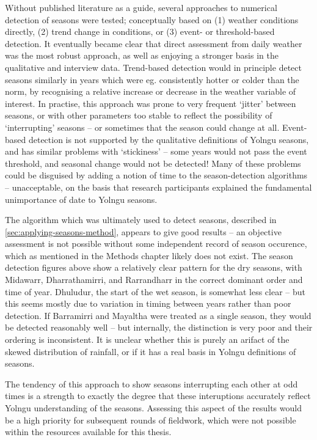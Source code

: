 Without published literature as a guide, several approaches to numerical
detection of seasons were tested; conceptually based on (1) weather conditions
directly, (2) trend change in conditions, or (3) event- or threshold-based
detection.  It eventually became clear that direct assessment from daily
weather was the most robust approach, as well as enjoying a stronger basis
in the qualitative and interview data.
%
Trend-based detection would in principle detect seasons similarly in years
which were eg. consistently hotter or colder than the norm, by recognising
a relative increase or decrease in the weather variable of interest.  In
practise, this approach was prone to very frequent `jitter' between seasons,
or with other parameters too stable to reflect the possibility of `interrupting'
seasons -- or sometimes that the season could change at all.
%
Event-based detection is not supported by the qualitative definitions of Yolngu
seasons, and has similar problems with `stickiness' -- some years would
not pass the event threshold, and seasonal change would not be detected!
%
Many of these problems could be disguised by adding a notion of time to the
season-detection algorithms -- unacceptable, on the basis that research
participants explained the fundamental unimportance of date to Yolngu seasons.


The algorithm which was ultimately used to detect seasons,
described in \cref{sec:applying-seasons-method}, appears to give good results
-- an objective assessment is not possible without some independent record of
season occurence, which as mentioned in the Methods chapter likely does not exist.
%
The season detection figures above show a relatively clear pattern for the
dry seasons, with Midawarr, Dharrathamirri, and Rarrandharr in the correct
dominant order and time of year.  Dhuludur, the start of the wet season, is
somewhat less clear -- but this seems mostly due to variation in timing between
years rather than poor detection.  If Barramirri and Mayaltha were treated as
a single season, they would be detected reasonably well -- but internally,
the distinction is very poor and their ordering is inconsistent. It is unclear
whether this is purely an arifact of the skewed distribution of rainfall,
or if it has a real basis in Yolngu definitions of seasons.


The tendency of this approach to show seasons interrupting each other at odd
times is a strength to exactly the degree that these interuptions accurately
reflect Yolngu understanding of the seasons.  Assessing this aspect of the
results would be a high priority for subsequent rounds of fieldwork, which
were not possible within the resources available for this thesis.

